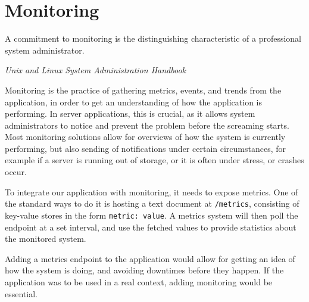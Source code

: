 \documentclass[../../master.tex]{subfiles}
\begin{document}
\section{Monitoring}
\epigraph{A commitment to monitoring is the distinguishing characteristic of a professional system administrator.}{\textit{Unix and Linux System Administration Handbook\cite{sysadmin}}}

Monitoring is the practice of gathering metrics, events, and trends from the application, in order to get an understanding of how the application is performing.
In server applications, this is crucial, as it allows system administrators to notice and prevent the problem before the screaming starts.
Most monitoring solutions allow for overviews of how the system is currently performing, but also sending of notifications under certain circumstances, for example if a server is running out of storage, or it is often under stress, or crashes occur.\cite{sysadmin}

To integrate our application with monitoring, it needs to expose metrics.
One of the standard ways to do it is hosting a text document at \texttt{/metrics}, consisting of key-value stores in the form \texttt{metric: value}.
A metrics system will then poll the endpoint at a set interval, and use the fetched values to provide statistics about the monitored system.

Adding a metrics endpoint to the application would allow for getting an idea of how the system is doing, and avoiding downtimes before they happen. If the application was to be used in a real context, adding monitoring would be essential.
\end{document}
